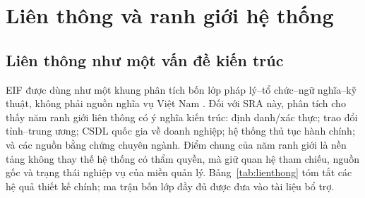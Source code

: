 \section{Liên thông và ranh giới hệ thống}
\label{sec:interop}

\subsection{Liên thông như một vấn đề kiến trúc}
\label{subsec:matran}

EIF được dùng như một khung phân tích bốn lớp pháp lý--tổ chức--ngữ nghĩa--kỹ thuật, không phải nguồn nghĩa vụ Việt Nam \citep[Hình~3, p.~22; pp.~27--30]{eif2017}. Đối với SRA này, phân tích cho thấy năm ranh giới liên thông có ý nghĩa kiến trúc: định danh/xác thực; trao đổi tỉnh--trung ương; CSDL quốc gia về doanh nghiệp; hệ thống thủ tục hành chính; và các nguồn bằng chứng chuyên ngành. Điểm chung của năm ranh giới là nền tảng không thay thế hệ thống có thẩm quyền, mà giữ quan hệ tham chiếu, nguồn gốc và trạng thái nghiệp vụ của miền quản lý. Bảng~\ref{tab:lienthong} tóm tắt các hệ quả thiết kế chính; ma trận bốn lớp đầy đủ được đưa vào tài liệu bổ trợ.

